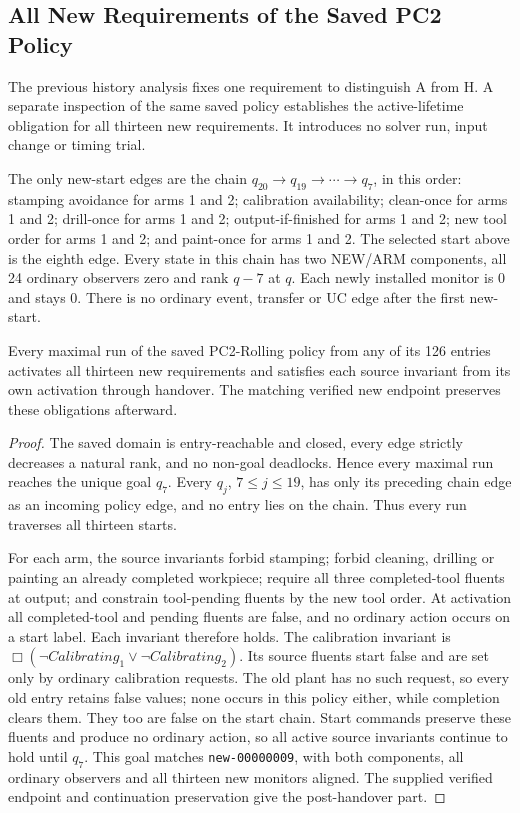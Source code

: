 \subsection{All New Requirements of the Saved PC2 Policy}\label{ta:pc2_all_act}
The previous history analysis fixes one requirement to distinguish A from H. A separate inspection of the same saved policy establishes the active-lifetime obligation for all thirteen new requirements. It introduces no solver run, input change or timing trial.

The only new-start edges are the chain $q_{20}\to q_{19}\to\cdots\to q_7$, in this order: stamping avoidance for arms 1 and 2; calibration availability; clean-once for arms 1 and 2; drill-once for arms 1 and 2; output-if-finished for arms 1 and 2; new tool order for arms 1 and 2; and paint-once for arms 1 and 2. The selected start above is the eighth edge. Every state in this chain has two NEW/ARM components, all 24 ordinary observers zero and rank $q-7$ at $q$. Each newly installed monitor is 0 and stays 0. There is no ordinary event, transfer or UC edge after the first new-start.

\begin{proposition}\label{prop:pc2-all-act}
Every maximal run of the saved PC2-Rolling policy from any of its 126 entries activates all thirteen new requirements and satisfies each source invariant from its own activation through handover. The matching verified new endpoint preserves these obligations afterward.
\end{proposition}
\begin{proof}
The saved domain is entry-reachable and closed, every edge strictly decreases a natural rank, and no non-goal deadlocks. Hence every maximal run reaches the unique goal $q_7$. Every $q_j$, $7\le j\le19$, has only its preceding chain edge as an incoming policy edge, and no entry lies on the chain. Thus every run traverses all thirteen starts.

For each arm, the source invariants forbid stamping; forbid cleaning, drilling or painting an already completed workpiece; require all three completed-tool fluents at output; and constrain tool-pending fluents by the new tool order. At activation all completed-tool and pending fluents are false, and no ordinary action occurs on a start label. Each invariant therefore holds. The calibration invariant is $\Box(\neg Calibrating_1\lor\neg Calibrating_2)$. Its source fluents start false and are set only by ordinary calibration requests. The old plant has no such request, so every old entry retains false values; none occurs in this policy either, while completion clears them. They too are false on the start chain. Start commands preserve these fluents and produce no ordinary action, so all active source invariants continue to hold until $q_7$. This goal matches \texttt{new-00000009}, with both components, all ordinary observers and all thirteen new monitors aligned. The supplied verified endpoint and continuation preservation give the post-handover part.
\end{proof}

